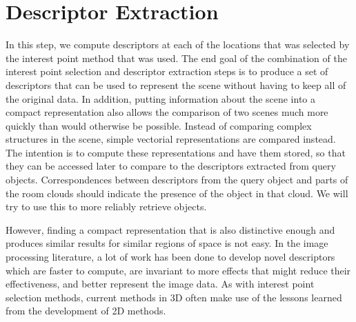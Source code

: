 \documentclass[11pt,a4paper]{kth-mag}
\begin{document}
\chapter{Descriptor Extraction}
\label{chap:descriptors}
In this step, we compute descriptors at each of the locations that was selected
by the interest point method that was used. The end goal of the combination of
the interest point selection and descriptor extraction steps is to produce a set
of descriptors that can be used to represent the scene without having to keep
all of the original data. In addition, putting information about the scene into
a compact representation also allows the comparison of two scenes much more
quickly than would otherwise be possible. Instead of comparing complex
structures in the scene, simple vectorial representations are compared instead.
The intention is to compute these representations and have them stored, so that
they can be accessed later to compare to the descriptors extracted from query
objects. Correspondences between descriptors from the query object and parts of
the room clouds should indicate the presence of the object in that cloud. We
will try to use this to more reliably retrieve objects.

However, finding a compact representation that is also distinctive enough and
produces similar results for similar regions of space is not easy. In the image
processing literature, a lot of work has been done to develop novel descriptors
which are faster to compute, are invariant to more effects that might reduce
their effectiveness, and better represent the image data. As with interest point
selection methods, current methods in 3D often make use of the lessons learned
from the development of 2D methods. 
\end{document}
